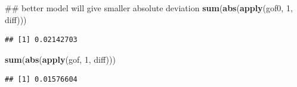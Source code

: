 \documentclass[]{article}
\newenvironment{Shaded}{\begin{snugshade}}{\end{snugshade}}
\newcommand{\KeywordTok}[1]{\textcolor[rgb]{0.13,0.29,0.53}{\textbf{#1}}}
\newcommand{\DecValTok}[1]{\textcolor[rgb]{0.00,0.00,0.81}{#1}}
\newcommand{\NormalTok}[1]{#1}
\begin{document}
\begin{Shaded}
\begin{Highlighting}[]
\NormalTok{## better model will give smaller absolute deviation}
\KeywordTok{sum}\NormalTok{(}\KeywordTok{abs}\NormalTok{(}\KeywordTok{apply}\NormalTok{(gof0, }\DecValTok{1}\NormalTok{, diff)))}
\end{Highlighting}
\end{Shaded}

\begin{verbatim}
## [1] 0.02142703
\end{verbatim}

\begin{Shaded}
\begin{Highlighting}[]
\KeywordTok{sum}\NormalTok{(}\KeywordTok{abs}\NormalTok{(}\KeywordTok{apply}\NormalTok{(gof, }\DecValTok{1}\NormalTok{, diff)))}
\end{Highlighting}
\end{Shaded}

\begin{verbatim}
## [1] 0.01576604
\end{verbatim}
\end{document}

